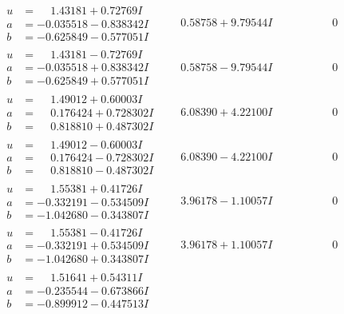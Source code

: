\documentclass[1p]{elsarticle_modified}
\theoremstyle{definition}
\begin{document}
$$\begin{array}{c|c|c}
\begin{aligned}
u &= \phantom{-}1.43181 + 0.72769 I \\
a &= -0.035518 - 0.838342 I \\
b &= -0.625849 - 0.577051 I\end{aligned}
 & \phantom{-}0.58758 + 9.79544 I & \phantom{-0.000000 } 0 \\ \hline\begin{aligned}
u &= \phantom{-}1.43181 - 0.72769 I \\
a &= -0.035518 + 0.838342 I \\
b &= -0.625849 + 0.577051 I\end{aligned}
 & \phantom{-}0.58758 - 9.79544 I & \phantom{-0.000000 } 0 \\ \hline\begin{aligned}
u &= \phantom{-}1.49012 + 0.60003 I \\
a &= \phantom{-}0.176424 + 0.728302 I \\
b &= \phantom{-}0.818810 + 0.487302 I\end{aligned}
 & \phantom{-}6.08390 + 4.22100 I & \phantom{-0.000000 } 0 \\ \hline\begin{aligned}
u &= \phantom{-}1.49012 - 0.60003 I \\
a &= \phantom{-}0.176424 - 0.728302 I \\
b &= \phantom{-}0.818810 - 0.487302 I\end{aligned}
 & \phantom{-}6.08390 - 4.22100 I & \phantom{-0.000000 } 0 \\ \hline\begin{aligned}
u &= \phantom{-}1.55381 + 0.41726 I \\
a &= -0.332191 - 0.534509 I \\
b &= -1.042680 - 0.343807 I\end{aligned}
 & \phantom{-}3.96178 - 1.10057 I & \phantom{-0.000000 } 0 \\ \hline\begin{aligned}
u &= \phantom{-}1.55381 - 0.41726 I \\
a &= -0.332191 + 0.534509 I \\
b &= -1.042680 + 0.343807 I\end{aligned}
 & \phantom{-}3.96178 + 1.10057 I & \phantom{-0.000000 } 0 \\ \hline\begin{aligned}
u &= \phantom{-}1.51641 + 0.54311 I \\
a &= -0.235544 - 0.673866 I \\
b &= -0.899912 - 0.447513 I\end{aligned}

\end{array}$$
\end{document}
